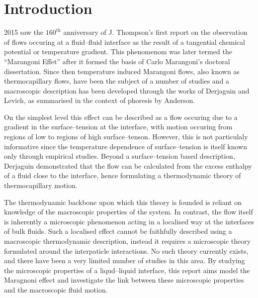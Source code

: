 \section{Introduction}
2015 saw the $160^{\mathrm{th}}$ anniversary of J. Thompson's first report\cite{JThompson} on the observation of flows occuring at a fluid--fluid interface as the result of a tangential chemical potential or temperature gradient.
This phenomenom was later termed the ``Marangoni Effet'' after it formed the basis of Carlo Marangoni's doctoral dissertation.\cite{Marangoni}
Since then temperature induced Marangoni flows, also known as thermocapillary flows, have been the subject of a number of studies and a macroscopic description has been developed through the works of Derjaguin\cite{SurfaceForces} and Levich\cite{Levich}, as summarised in the context of phoresis by Anderson\cite{Anderson}.

On the simplest level this effect can be described as a flow occuring due to a gradient in the surface--tension at the interface, with motion occuring from regions of low to regions of high surface--tenson.
However, this is not particulaly informative since the temperature dependence of surface--tension is itself known only through empirical studies.
Beyond a surface--tension based description, Derjaguin demonstrated that the flow can be calculated from the excess enthalpy of a fluid close to the interface, hence formulating a thermodynamic theory of thermocapillary motion.\cite{SurfaceForces}

The thermodynamic backbone upon which this theory is founded is reliant on knowledge of the macroscopic properties of the system.
In contrast, the flow itself is inherently a microscopic phenomenon acting in a localised way at the interfaces of bulk fluids. 
Such a localised effect cannot be faithfully described using a macroscopic thermodynamic description, instead it requires a microscopic theory formulated around the interpaticle interactions. 
No such theory currently exists, and there have been a very limited number of studies in this area.\cite{HolgerBoppHampe}
By studying the microscopic properties of a liqud--liquid interface, this report aims model the Maragnoni effect and investigate the link between these microscopic properties and the macroscopic fluid motion.


